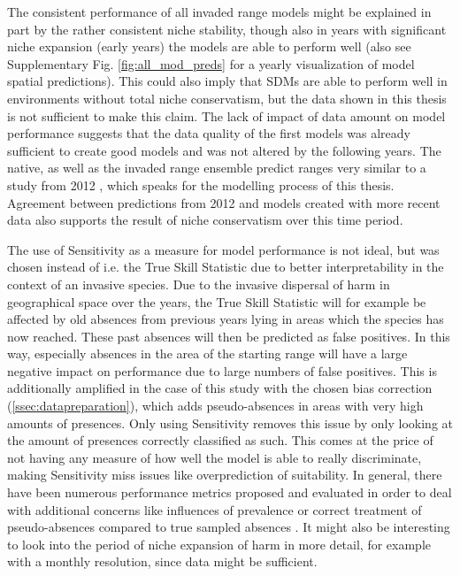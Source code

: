 \documentclass[12pt,a4paper]{article}
\begin{document}
The consistent performance of all invaded range models might be explained in part by the rather consistent niche stability, though also in years with significant niche expansion (early years) the models are able to perform well (also see Supplementary Fig. \ref{fig:all_mod_preds} for a yearly visualization of model spatial predictions).
This could also imply that SDMs are able to perform well in environments without total niche conservatism, but the data shown in this thesis is not sufficient to make this claim.
The lack of impact of data amount on model performance suggests that the data quality of the first models was already sufficient to create good models and was not altered by the following years.
The native, as well as the invaded range ensemble predict ranges very similar to a study from 2012 \autocite{bidinger2012harmSDMglobalMaxent}, which speaks for the modelling process of this thesis.
Agreement between predictions from 2012 and models created with more recent data also supports the result of niche conservatism over this time period.

The use of Sensitivity as a measure for model performance is not ideal, but was chosen instead of i.e. the True Skill Statistic due to better interpretability in the context of an invasive species.
Due to the invasive dispersal of \gls{harm} in geographical space over the years, the True Skill Statistic will for example be affected by old absences from previous years lying in areas which the species has now reached. These past absences will then be predicted as false positives.
In this way, especially absences in the area of the starting range will have a large negative impact on performance due to large numbers of false positives.
This is additionally amplified in the case of this study with the chosen bias correction (\autoref{ssec:datapreparation}), which adds pseudo-absences in areas with very high amounts of presences.
Only using Sensitivity removes this issue by only looking at the amount of presences correctly classified as such.
This comes at the price of not having any measure of how well the model is able to really discriminate, making Sensitivity miss issues like overprediction of suitability.
In general, there have been numerous performance metrics proposed and evaluated in order to deal with additional concerns like influences of prevalence or correct treatment of pseudo-absences compared to true sampled absences \autocite{leroy2018TSSissues, konowalik2021SDMmetrics}.
It might also be interesting to look into the period of niche expansion of \gls{harm} in more detail, for example with a monthly resolution, since data might be sufficient.
\end{document}
